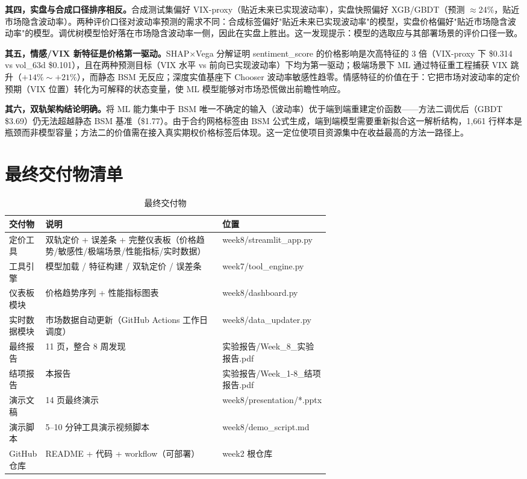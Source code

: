 \documentclass[11pt,a4paper]{article}
\begin{document}
\textbf{其四，实盘与合成口径排序相反。}合成测试集偏好 VIX-proxy（贴近未来已实现波动率），实盘快照偏好 XGB/GBDT（预测 $\approx$24\%，贴近市场隐含波动率）。两种评价口径对波动率预测的需求不同：合成标签偏好"贴近未来已实现波动率"的模型，实盘价格偏好"贴近市场隐含波动率"的模型。调优树模型恰好落在市场隐含波动率一侧，因此在实盘上胜出。这一发现提示：模型的选取应与其部署场景的评价口径一致。

\textbf{其五，情感/VIX 新特征是价格第一驱动。}SHAP$\times$Vega 分解证明 sentiment\_score 的价格影响是次高特征的 3 倍（VIX-proxy 下 \$0.314 vs vol\_63d \$0.101），且在两种预测目标（VIX 水平 vs 前向已实现波动率）下均为第一驱动；极端场景下 ML 通过特征重工程捕获 VIX 跳升（$+14\%\sim+21\%$），而静态 BSM 无反应；深度实值基座下 Chooser 波动率敏感性趋零。情感特征的价值在于：它把市场对波动率的定价预期（VIX 位置）转化为可解释的状态变量，使 ML 模型能够对市场恐慌做出前瞻性响应。

\textbf{其六，双轨架构结论明确。}将 ML 能力集中于 BSM 唯一不确定的输入（波动率）优于端到端重建定价函数——方法二调优后（GBDT \$3.69）仍无法超越静态 BSM 基准（\$1.77）。由于合约网格标签由 BSM 公式生成，端到端模型需要重新拟合这一解析结构，1,661 行样本是瓶颈而非模型容量；方法二的价值需在接入真实期权价格标签后体现。这一定位使项目资源集中在收益最高的方法一路径上。

\section{最终交付物清单}

\begin{table}[H]
\centering
\caption{最终交付物}
\label{tab:deliverables}
\begin{tabular}{@{}lp{0.62\linewidth}l@{}}
\toprule
交付物 & 说明 & 位置 \\
\midrule
定价工具 & 双轨定价 + 误差条 + 完整仪表板（价格趋势/敏感性/极端场景/性能指标/实时数据） & week8/streamlit\_app.py \\
工具引擎 & 模型加载 / 特征构建 / 双轨定价 / 误差条 & week7/tool\_engine.py \\
仪表板模块 & 价格趋势序列 + 性能指标图表 & week8/dashboard.py \\
实时数据模块 & 市场数据自动更新（GitHub Actions 工作日调度） & week8/data\_updater.py \\
最终报告 & 11 页，整合 8 周发现 & 实验报告/Week\_8\_实验报告.pdf \\
结项报告 & 本报告 & 实验报告/Week\_1-8\_结项报告.pdf \\
演示文稿 & 14 页最终演示 & week8/presentation/*.pptx \\
演示脚本 & 5--10 分钟工具演示视频脚本 & week8/demo\_script.md \\
GitHub 仓库 & README + 代码 + workflow（可部署） & week2 根仓库 \\
\bottomrule
\end{tabular}
\end{table}
\end{document}
